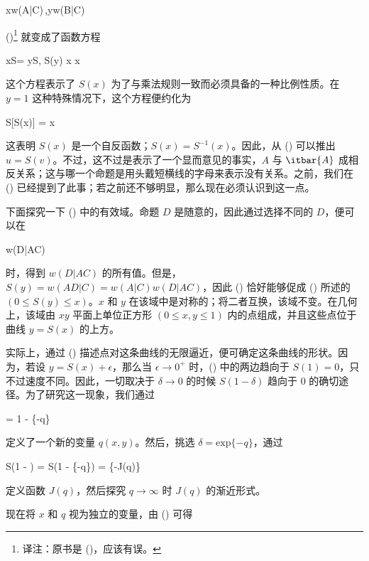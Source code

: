 \placeformula[2-44]
\startformula
x\equiv w(A|C)\,,\quad\quad y\equiv w(B|C)
\stopformula

(\in[2-40])\footnote{译注：原书是 (\in[2-25])，应该有误。} 就变成了函数方程

\placeformula[2-45]
\startformula
xS = yS,\quad\quad
\startmathmatrix[align=left]
 \le S(y) \le x \NR
{} \le x  \NR
\stopmathmatrix
\stopformula

这个方程表示了 $S(x)$ 为了与乘法规则一致而必须具备的一种比例性质。在 $y = 1$ 这种特殊情况下，这个方程便约化为

\placeformula[2-46]
\startformula
S[S(x)] = x
\stopformula

这表明 $S(x)$ 是一个自反函数；$S(x) = S^{-1}(x)$。因此，从 (\in[2-36]) 可以推出 $u = S(v)$。不过，这不过是表示了一个显而意见的事实，$A$ 与 $\itbar{A}$ 成相反关系；这与哪一个命题是用头戴短横线的字母来表示没有关系。之前，我们在 (\in[1-8]) 已经提到了此事；若之前还不够明显，那么现在必须认识到这一点。

下面探究一下 (\in[2-45]) 中的有效域。命题 $D$ 是随意的，因此通过选择不同的 $D$，便可以在

\placeformula[2-47]
 \le w(D|AC) 
\stopformula

时，得到 $w(D|AC)$ 的所有值。但是，$S(y) = w(AD|C) = w(A|C)w(D|AC)$，因此 (\in[2-47]) 恰好能够促成 (\in[2-45]) 所述的 $(0 \le S(y) \le x)$。$x$ 和 $y$ 在该域中是对称的；将二者互换，该域不变。在几何上，该域由 $xy$ 平面上单位正方形 $(0\le x, y\le 1)$ 内的点组成，并且这些点位于曲线 $y = S(x)$ 的上方。

实际上，通过 (\in[2-45]) 描述点对这条曲线的无限逼近，便可确定这条曲线的形状。因为，若设 $y = S(x) + \epsilon$，那么当 $\epsilon \rightarrow 0^{+}$ 时，(\in[2-45]) 中的两边趋向于 $S(1) = 0$，只不过速度不同。因此，一切取决于 $\delta\rightarrow 0$ 的时候 $S(1 - \delta)$ 趋向于 0 的确切途径。为了研究这一现象，我们通过

\placeformula[2-48]
\startformula
{} = 1 - \{-q\}
\stopformula

定义了一个新的变量 $q(x, y)$。然后，挑选 $\delta = \text{exp}\{-q\}$，通过

\placeformula[2-49]
\startformula
S(1 - \delta) = S(1 - \{-q\}) = \{-J(q)\}
\stopformula

定义函数 $J(q)$，然后探究 $q\rightarrow\infty$ 时 $J(q)$ 的渐近形式。

现在将 $x$ 和 $q$ 视为独立的变量，由 (\in[2-48]) 可得

